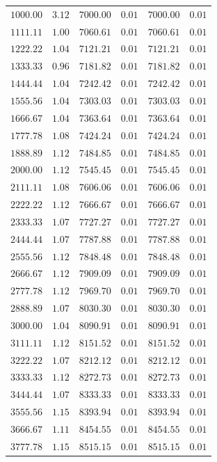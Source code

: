 \documentclass[
	12pt,
	]{article}
\theoremstyle{definition}
\theoremstyle{definition}
\theoremstyle{definition}
\theoremstyle{definition}
\theoremstyle{definition}
\theoremstyle{example}
\theoremstyle{note}
\theoremstyle{remark}
\theoremstyle{example}
\begin{document}
\begin{longtable}{cccccc}
				\midrule
				$1000.00$&	$3.12$&	$7000.00$&	$0.01$&	$7000.00$&	$0.01$\\		
				$1111.11$&	$1.00$&	$7060.61$&	$0.01$&	$7060.61$&	$0.01$\\
				$1222.22$&	$1.04$&	$7121.21$&	$0.01$&	$7121.21$&	$0.01$\\
				$1333.33$&	$0.96$&	$7181.82$&	$0.01$&	$7181.82$&	$0.01$\\
				$1444.44$&	$1.04$&	$7242.42$&	$0.01$&	$7242.42$&	$0.01$\\
				$1555.56$&	$1.04$&	$7303.03$&	$0.01$&	$7303.03$&	$0.01$\\
				$1666.67$&	$1.04$&	$7363.64$&	$0.01$&	$7363.64$&	$0.01$\\
				$1777.78$&	$1.08$&	$7424.24$&	$0.01$&	$7424.24$&	$0.01$\\
				$1888.89$&	$1.12$&	$7484.85$&	$0.01$&	$7484.85$&	$0.01$\\
				$2000.00$&	$1.12$&	$7545.45$&	$0.01$&	$7545.45$&	$0.01$\\
				$2111.11$&	$1.08$&	$7606.06$&	$0.01$&	$7606.06$&	$0.01$\\
				$2222.22$&	$1.12$&	$7666.67$ &  $0.01$&	$7666.67$&	$0.01$\\
				$2333.33$&	$1.07$&	$7727.27$&	$0.01$&	$7727.27$&	$0.01$\\
				$2444.44$&	$1.07$&	$7787.88$&	$0.01$&	$7787.88$&	$0.01$\\
				$2555.56$&	$1.12$&	$7848.48$&	$0.01$&	$7848.48$&	$0.01$\\
				$2666.67$&	$1.12$&	$7909.09$&	$0.01$&	$7909.09$&	$0.01$\\
				$2777.78$&	$1.12$&	$7969.70$&	$0.01$&	$7969.70$&	$0.01$\\
				$2888.89$&	$1.07$&	$8030.30$&	$0.01$&	$8030.30$&	$0.01$\\
				$3000.00$&	$1.04$&	$8090.91$&	$0.01$&	$8090.91$&	$0.01$\\
				$3111.11$&	$1.12$&	$8151.52$&	$0.01$&	$8151.52$&	$0.01$\\
				$3222.22$&	$1.07$&	$8212.12$&	$0.01$&	$8212.12$&	$0.01$\\
				$3333.33$&	$1.12$&	$8272.73$&	$0.01$&	$8272.73$&	$0.01$\\
				$3444.44$&	$1.07$&	$8333.33$&	$0.01$&	$8333.33$&	$0.01$\\
				$3555.56$&	$1.15$&	$8393.94$&	$0.01$&	$8393.94$&	$0.01$\\
				$3666.67$&	$1.11$&	$8454.55$&	$0.01$&	$8454.55$&	$0.01$\\
				$3777.78$&	$1.15$&	$8515.15$&	$0.01$&	$8515.15$&	$0.01$\\

\end{longtable}
\end{document}
